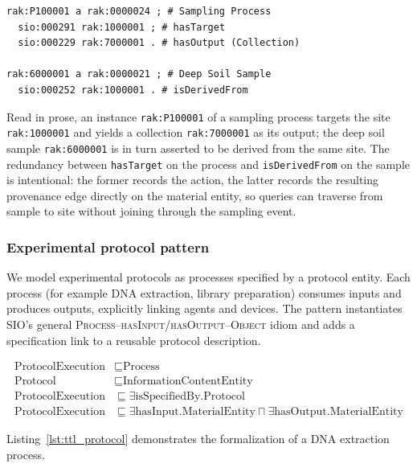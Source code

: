 \documentclass[11pt,a4paper]{article}
\begin{document}
\begin{lstlisting}[caption={Turtle representation of a sampling process.},
  label={lst:ttl_sampling}, basicstyle=\ttfamily\scriptsize, frame=single]
rak:P100001 a rak:0000024 ; # Sampling Process
  sio:000291 rak:1000001 ; # hasTarget
  sio:000229 rak:7000001 . # hasOutput (Collection)

rak:6000001 a rak:0000021 ; # Deep Soil Sample
  sio:000252 rak:1000001 . # isDerivedFrom
\end{lstlisting}

Read in prose, an instance \texttt{rak:P100001} of a sampling process
targets the site \texttt{rak:1000001} and yields a collection
\texttt{rak:7000001} as its output; the deep soil sample
\texttt{rak:6000001} is in turn asserted to be derived from the same
site. The redundancy between \texttt{hasTarget} on the process and
\texttt{isDerivedFrom} on the sample is intentional: the former
records the action, the latter records the resulting provenance edge
directly on the material entity, so queries can traverse from sample
to site without joining through the sampling event.

\subsubsection{Experimental protocol pattern}

We model experimental protocols as processes specified by a protocol
entity. Each process (for example DNA extraction, library preparation)
consumes inputs and produces outputs, explicitly linking agents and
devices. The pattern instantiates SIO's general
\textsc{Process--hasInput/hasOutput--Object} idiom and adds a
specification link to a reusable protocol description.

\begin{align}
    \label{eq:protocol}
    \text{ProtocolExecution} & \sqsubseteq \text{Process} \\
    \text{Protocol} & \sqsubseteq \text{InformationContentEntity} \\
    \text{ProtocolExecution} & \sqsubseteq \exists
        \text{isSpecifiedBy}.\text{Protocol} \\
    \text{ProtocolExecution} & \sqsubseteq \exists
        \text{hasInput}.\text{MaterialEntity} \sqcap \exists
        \text{hasOutput}.\text{MaterialEntity}
\end{align}

Listing~\ref{lst:ttl_protocol} demonstrates the formalization of a
DNA extraction process.
\end{document}
